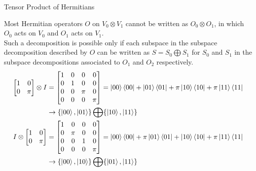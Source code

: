 \documentclass{beamer}
\begin{document}
\begin{frame}{Tensor Product of Hermitians}
  {\tiny
    Most Hermitian operators $O$ on $V_0 \otimes V_1$ cannot be written as $O_0 \otimes O_1$,
    in which $O_0$ acts on $V_0$ and $O_1$ acts on $V_1$. \\
    Such a decomposition is possible only if each subspace in the subspace decomposition described by $O$
    can be written as $S = S_0 \bigoplus S_1$
    for $S_0$ and $S_1$ in the subspace decompositions associated to $O_1$ and $O_2$ respectively. \\
    \begin{align*}
      \begin{bmatrix} 
        1 & 0 \\
        0 & \pi
      \end{bmatrix} \otimes I
      &=
      \begin{bmatrix}
        1 & 0 & 0 & 0 \\
        0 & 1 & 0 & 0 \\
        0 & 0 & \pi & 0 \\
        0 & 0 & 0 & \pi 
      \end{bmatrix}
      = \ket{00} \bra{00} + \ket{01} \bra{01} + \pi \ket{10} \bra{10} + \pi \ket{11} \bra{11} \\
      & \rightarrow \{\ket{00}, \ket{01}\} \bigoplus \{\ket{10}, \ket{11}\} \\
      I \otimes
      \begin{bmatrix} 
        1 & 0 \\
        0 & \pi
      \end{bmatrix}
      &=
      \begin{bmatrix}
        1 & 0 & 0 & 0 \\
        0 & \pi & 0 & 0 \\
        0 & 0 & 1 & 0 \\
        0 & 0 & 0 & \pi 
      \end{bmatrix}
      = \ket{00} \bra{00} + \pi \ket{01} \bra{01} + \ket{10} \bra{10} + \pi \ket{11} \bra{11} \\
      & \rightarrow \{\ket{00}, \ket{10}\} \bigoplus \{\ket{01}, \ket{11}\}
    \end{align*}

}
\end{frame}
\end{document}
